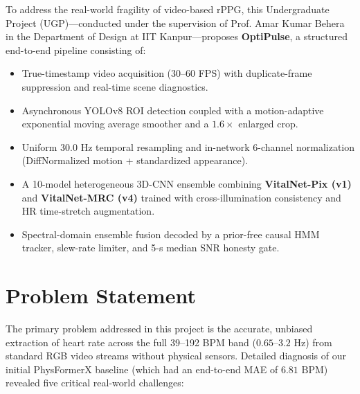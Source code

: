\documentclass[conference]{IEEEtran}
\begin{document}
To address the real-world fragility of video-based rPPG, this Undergraduate Project (UGP)---conducted under the supervision of Prof. Amar Kumar Behera in the Department of Design at IIT Kanpur---proposes \textbf{OptiPulse}, a structured end-to-end pipeline consisting of:
\begin{itemize}
    \item True-timestamp video acquisition (30--60 FPS) with duplicate-frame suppression and real-time scene diagnostics.
    \item Asynchronous YOLOv8 ROI detection coupled with a motion-adaptive exponential moving average smoother and a $1.6\times$ enlarged crop.
    \item Uniform $30.0\text{ Hz}$ temporal resampling and in-network 6-channel normalization (DiffNormalized motion + standardized appearance).
    \item A 10-model heterogeneous 3D-CNN ensemble combining \textbf{VitalNet-Pix (v1)} and \textbf{VitalNet-MRC (v4)} trained with cross-illumination consistency and HR time-stretch augmentation.
    \item Spectral-domain ensemble fusion decoded by a prior-free causal HMM tracker, slew-rate limiter, and 5-s median SNR honesty gate.
\end{itemize}

\section{Problem Statement}
The primary problem addressed in this project is the accurate, unbiased extraction of heart rate across the full 39--192 BPM band ($0.65\text{--}3.2\text{ Hz}$) from standard RGB video streams without physical sensors. Detailed diagnosis of our initial PhysFormerX baseline (which had an end-to-end MAE of $6.81\text{ BPM}$) revealed five critical real-world challenges:
\end{document}
